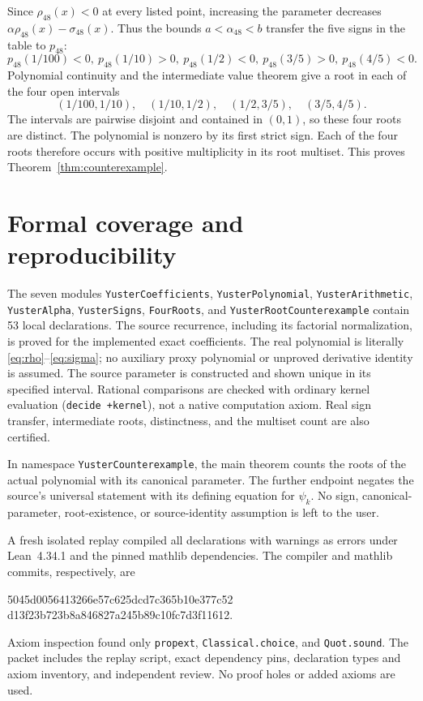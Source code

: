 \documentclass[11pt]{article}
\begin{document}
Since $\rho_{48}(x)<0$ at every listed point, increasing the parameter
decreases $\alpha\rho_{48}(x)-\sigma_{48}(x)$. Thus the bounds
$a<\alpha_{48}<b$ transfer the five signs in the table to $p_{48}$:
\[
 p_{48}(1/100)<0, \ p_{48}(1/10)>0, \ p_{48}(1/2)<0, \
 p_{48}(3/5)>0, \ p_{48}(4/5)<0.
\]
Polynomial continuity and the intermediate value theorem give a root
in each of the four open intervals
\[
 (1/100,1/10),\quad(1/10,1/2),\quad(1/2,3/5),\quad(3/5,4/5).
\]
The intervals are pairwise disjoint and contained in $(0,1)$, so these
four roots are distinct. The polynomial is nonzero by its first strict
sign. Each of the four roots therefore occurs with positive
multiplicity in its root multiset. This proves
Theorem~\ref{thm:counterexample}.

\section{Formal coverage and reproducibility}
The seven modules \texttt{YusterCoefficients},
\texttt{YusterPolynomial}, \texttt{YusterArithmetic},
\texttt{YusterAlpha}, \texttt{YusterSigns}, \texttt{FourRoots}, and
\texttt{YusterRootCounterexample} contain 53 local declarations.
The source recurrence, including its factorial normalization, is
proved for the implemented exact coefficients. The real polynomial is
literally \eqref{eq:rho}--\eqref{eq:sigma}; no auxiliary proxy
polynomial or unproved derivative identity is assumed. The source
parameter is constructed and shown unique in its specified interval.
Rational comparisons are checked with ordinary kernel evaluation
(\texttt{decide +kernel}), not a native computation axiom. Real sign
transfer, intermediate roots, distinctness, and the multiset count are
also certified.

In namespace \texttt{YusterCounterexample}, the main theorem
counts the roots of the actual polynomial with its canonical
parameter. The further endpoint
negates the source's universal statement with its defining equation
for $\psi_k$. No sign, canonical-parameter, root-existence, or
source-identity assumption is left to the user.

A fresh isolated replay compiled all declarations with warnings as
errors under Lean~4.34.1 and the pinned mathlib dependencies. The
compiler and mathlib commits, respectively, are
\begin{center}\small\ttfamily
5045d0056413266e57c625dcd7c365b10e377c52\\
d13f23b723b8a846827a245b89c10fc7d3f11612.
\end{center}
Axiom inspection found only \texttt{propext},
\texttt{Classical.choice}, and \texttt{Quot.sound}. The packet includes
the replay script, exact dependency pins, declaration types and axiom
inventory, and independent review. No proof holes or added axioms are
used.
\end{document}
